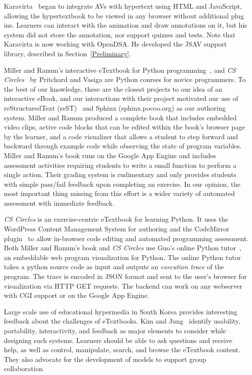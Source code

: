 \documentclass[11pt]{article}
\begin{document}
Karavirta~\cite{Karavirta2009} began to integrate AVs with hypertext
using HTML and JavaScript, allowing the hypertextbook to be viewed
in any browser without additional plug ins.
Learners can interact with the animation and draw annotations on it,
but his system did not store the annotation, nor support quizzes and
tests.
Note that Karavirta is now working with OpenDSA.
He developed the JSAV support library, described in
Section~\ref{Preliminary}.
  
Miller and Ranum's interactive eTextbook for Python
programming~\cite{miller2012}, and
\emph{CS Circles}~\cite{pritchard2013}
by Pritchard and Vasiga are Python courses for novice programmers.
To the best of our knowledge, these are the closest projects to our
idea of an interactive eBook, and our interactions with their project
motivated our use of reStructuredText (reST)~\cite{RST} and Sphinx
(sphinx.pocoo.org) as our authoring system.
Miller and Ranum produced a complete book that includes
embedded video clips, active code blocks that can be edited within the
book's browser page by the learner, and a code visualizer
that allows a student to step forward and backward through example
code while observing the state of program variables.
Miller and Ranum's book runs on the Google App Engine and includes
assessment activities requiring students to write a small function to
perform a single action.
Their grading system is rudimentary and only provides students
with simple pass/fail feedback upon completing an exercise.
In our opinion, the most important thing missing from this effort is a
wider variety of automated assessment with immediate feedback.

\emph{CS Circles} is an exercise-centric
eTextbook for learning Python.
It uses the WordPress Content Management System for authoring
and the CodeMirror plugin~\cite{haverbeke2011} to allow in-browser
code editing and automated programming assessment.
Both Miller and Ranum's book and \emph{CS Circles} use Guo's online
Python tutor~\cite{guo2013}, an embeddable web program visualization
for Python.
The online Python tutor takes a python source code as input and
outputs an \textit{execution trace} of the program.
The trace is encoded in JSON format and sent to the user's browser for
visualization via HTTP GET requests.
The backend can work on any webserver with CGI support or on the
Google App Engine.

Large scale use of educational hypermedia in South Korea
provides interesting feedback about the challenges of eTextbooks.
Kim and Jung~\cite{Korea} identify usability, portability,
interactivity, and feedback as major elements to consider while
designing such systems.
Learners should be able to ask questions and receive help, as well as
control, manipulate, search, and browse the eTextbook content.
They also advocate for the development of models to support group
collaboration.
\end{document}

